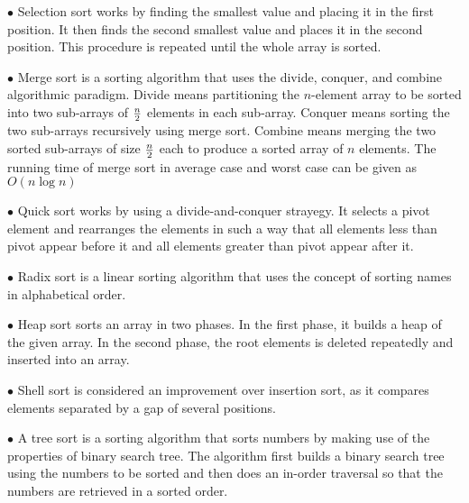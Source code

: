 \vskip 3mm
\qquad$\bullet$ Selection sort works by finding the smallest value and placing it in the first position. It then finds the second smallest value and places it in the second position. This procedure is repeated until the whole array is sorted.

\vskip 3mm
\qquad$\bullet$ Merge sort is a sorting algorithm that uses the divide, conquer, and combine algorithmic paradigm. Divide means partitioning the $n$-element array to be sorted into two sub-arrays of ${n\over 2}$ elements in each sub-array. Conquer means sorting the two sub-arrays recursively using merge sort. Combine means merging the two sorted sub-arrays of size ${n\over 2}$ each to produce a sorted array of $n$ elements. The running time of merge sort in average case and worst case can be given as $O(n\log n)$

\vskip 3mm
\qquad$\bullet$ Quick sort works by using a divide-and-conquer strayegy. It selects a pivot element and rearranges the elements in such a way that all elements less than pivot appear before it and all elements greater than pivot appear after it.

\vskip 3mm
\qquad$\bullet$ Radix sort is a linear sorting algorithm that uses the concept of sorting names in alphabetical order.

\vskip 3mm
\qquad$\bullet$ Heap sort sorts an array in two phases. In the first phase, it builds a heap of the given array. In the second phase, the root elements is deleted repeatedly and inserted into an array.

\vskip 3mm
\qquad$\bullet$ Shell sort is considered an improvement over insertion sort, as it compares elements separated by a gap of several positions.

\vskip 3mm
\qquad$\bullet$ A tree sort is a sorting algorithm that sorts numbers by making use of the properties of binary search tree. The algorithm first builds a binary search tree using the numbers to be sorted and then does an in-order traversal so that the numbers are retrieved in a sorted order.


\vfill\eject
\bye
